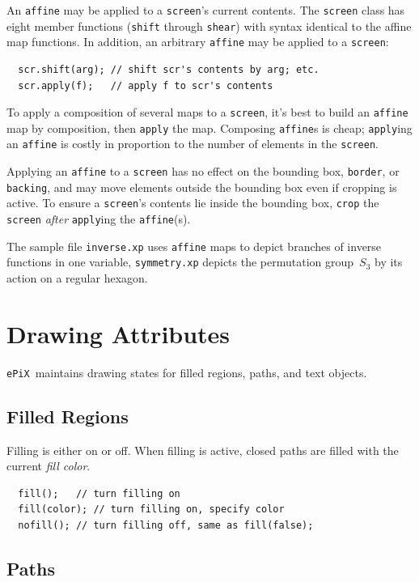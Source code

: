 \documentclass[12pt,letterpaper]{book}
\newcommand{\code}[1]{\texttt{#1}}
\newcommand{\filename}[1]{\texttt{#1}}
\newcommand{\ePiX}{\code{ePiX}}
\newcommand{\teximath}[1]{$#1$}
\newcommand{\findex}[1]{\ignorespaces}
\begin{document}
An \code{affine} may be applied to a \code{screen}'s current contents.
The \code{screen} class has eight member functions (\code{shift}
through \code{shear}) with syntax identical to the affine map
functions. In addition, an arbitrary \code{affine} may be applied to a
\code{screen}:
\findex{apply}
\begin{verbatim}
  scr.shift(arg); // shift scr's contents by arg; etc.
  scr.apply(f);   // apply f to scr's contents
\end{verbatim}
To apply a composition of several maps to a \code{screen}, it's best
to build an \code{affine} map by composition, then \code{apply} the
map. Composing \code{affine}s is cheap; \code{apply}ing an
\code{affine} is costly in proportion to the number of elements in the
\code{screen}.

Applying an \code{affine} to a \code{screen} has no effect on the
bounding box, \code{border}, or \code{backing}, and may move elements
outside the bounding box even if cropping is active. To ensure a
\code{screen}'s contents lie inside the bounding box, \code{crop} the
\code{screen} \emph{after} \code{apply}ing the \code{affine}(s).

The sample file \filename{inverse.xp} uses \code{affine} maps to
depict branches of inverse functions in one variable,
\filename{symmetry.xp} depicts the permutation group~\teximath{S_3}
by its action on a regular hexagon.


\section{Drawing Attributes}

\ePiX\ maintains drawing states for filled regions, paths, and text
objects.


\subsection{Filled Regions}

Filling is either on or off. When filling is active, closed paths are
filled with the current \emph{fill color}.
\findex{fill}
\findex{nofill}
\begin{verbatim}
  fill();   // turn filling on
  fill(color); // turn filling on, specify color
  nofill(); // turn filling off, same as fill(false);
\end{verbatim}


\subsection{Paths}
\end{document}
